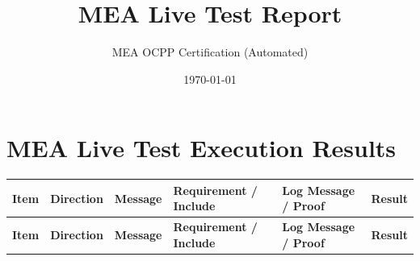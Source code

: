 \documentclass[10pt, a4paper, landscape]{article}
\title{\textbf{MEA Live Test Report}}
\author{MEA OCPP Certification (Automated)}
\date{\today}
\begin{document}
\maketitle

\section*{MEA Live Test Execution Results}

\renewcommand{\arraystretch}{1.3}
\begin{longtable}{|p{1.0cm}|p{2.5cm}|p{4.0cm}|p{5.0cm}|p{10.0cm}|c|}
\hline
\rowcolor{gray!30}
\textbf{Item} & \textbf{Direction} & \textbf{Message} & \textbf{Requirement / Include} & \textbf{Log Message / Proof} & \textbf{Result} \\
\hline
\endfirsthead

\hline
\hline
\rowcolor{gray!30}
\textbf{Item} & \textbf{Direction} & \textbf{Message} & \textbf{Requirement / Include} & \textbf{Log Message / Proof} & \textbf{Result} \\
\hline
\endhead


\end{longtable}
\end{document}

